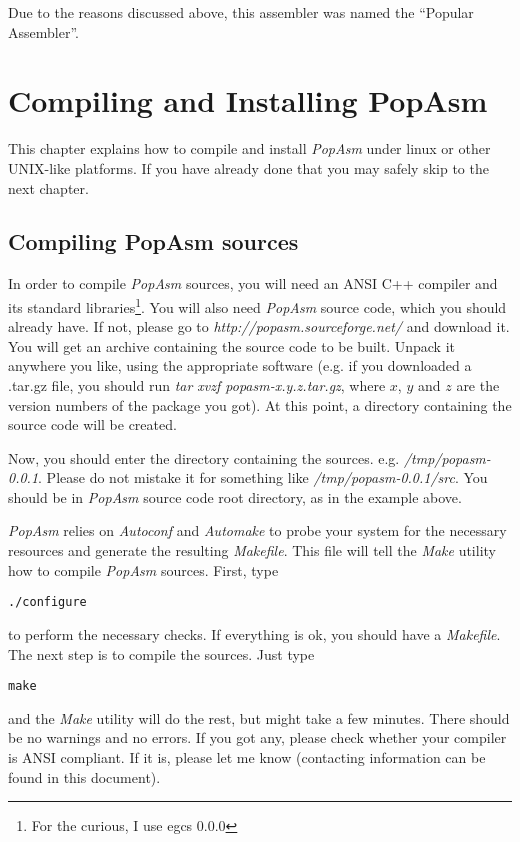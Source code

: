 \documentclass[a4paper,12pt]{book}
\begin{document}
Due to the reasons discussed above, this assembler was named the ``Popular Assembler''.

\chapter{Compiling and Installing PopAsm}
This chapter explains how to compile and install \emph{PopAsm} under linux or other UNIX-like
platforms. If you have already done that you may safely skip to the next chapter.

\section{Compiling PopAsm sources\label{COMPILING}}
In order to compile \emph{PopAsm} sources, you will need an ANSI C++ compiler and its standard
libraries\footnote{For the curious, I use egcs 0.0.0}. You will also need \emph{PopAsm} source
code, which you should already have. If not, please go to \emph{http://popasm.sourceforge.net/}
and download it. You will get an archive containing the source code to be built. Unpack it
anywhere you like, using the appropriate software (e.g. if you downloaded a .tar.gz file, you
should run \emph{tar xvzf popasm-x.y.z.tar.gz}, where $x$, $y$ and $z$ are the version numbers
of the package you got). At this point, a directory containing the source code will be created.

Now, you should enter the directory containing the sources. e.g. \emph{/tmp/popasm-0.0.1}. Please
do not mistake it for something like \emph{/tmp/popasm-0.0.1/src}. You should be in \emph{PopAsm}
source code root directory, as in the example above.

\emph{PopAsm} relies on \emph{Autoconf}\cite{AUTOCONF} and \emph{Automake}\cite{AUTOMAKE} to probe
your system for the necessary resources and generate the resulting \emph{Makefile}. This file will
tell the \emph{Make}\cite{MAKE} utility how to compile \emph{PopAsm} sources. First, type

\begin{verbatim}
./configure
\end{verbatim}

to perform the necessary checks. If everything is ok, you should have a \emph{Makefile}. The next
step is to compile the sources. Just type

\begin{verbatim}
make
\end{verbatim}

and the \emph{Make} utility will do the rest, but might take a few minutes. There should be no
warnings and no errors. If you got any, please check whether your compiler is ANSI compliant. If
it is, please let me know (contacting information can be found in this document).
\end{document}

